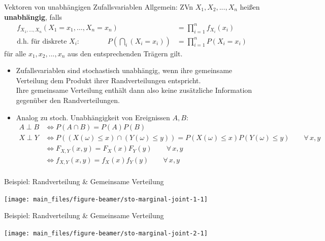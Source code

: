 \documentclass[
  10pt,
  ignorenonframetext,
]{beamer}
\begin{document}
\begin{frame}{Vektoren von unabhängigen Zufallsvariablen}
\label{vektoren-von-unabhuxe4ngigen-zufallsvariablen}
Allgemein: ZVn \(X_1, X_2, ..., X_n\) heißen \textbf{unabhängig}, falls
\begin{align*}
f_{X_1, \dots, X_n}(X_1 = x_1, ..., X_n = x_n) &= \prod_{i=1}^n f_{X_i}(x_i) \\
\text{d.h. für diskrete $X_i$:}\qquad\qquad P\left(\bigcap_i (X_i = x_i)\right) &= \prod_{i=1}^n P(X_i = x_i) 
\end{align*} für alle \(x_1, x_2, ..., x_n\) aus den entsprechenden
Trägern gilt.

\begin{itemize}
\item
  Zufallsvariablen sind stochastisch unabhängig, wenn ihre gemeinsame
  Verteilung dem Produkt ihrer Randverteilungen entspricht.\\
  Ihre gemeinsame Verteilung enthält dann also keine zusätzliche
  Information gegenüber den Randverteilungen.
\item
  Analog zu stoch. Unabhängigkeit von Ereignissen \(A, B\):
  \begin{align*}
  A \perp B &\iff P(A\cap B) = P(A)P(B) \\ 
  X \perp Y &\iff P((X(\omega) \leq x) \cap (Y(\omega) \leq y)) = P(X(\omega) \leq x)P(Y(\omega) \leq y) \qquad \forall\, x,y \\
                          &\iff F_{X,Y}(x, y) = F_X(x)F_Y(y)  \qquad \forall\, x,y  \\
                          &\iff f_{X,Y}(x, y) = f_X(x)f_Y(y)  \qquad \forall\, x,y  \\
  \end{align*}
\end{itemize}
\end{frame}

\begin{frame}{Beispiel: Randverteilung \& Gemeinsame Verteilung}
\label{beispiel-randverteilung-gemeinsame-verteilung}
\scriptsize\normalsize

\scriptsize

\begin{center}\texttt{[image: main\_files/figure-beamer/sto-marginal-joint-1-1]} \end{center}

\normalsize
\end{frame}

\begin{frame}{Beispiel: Randverteilung \& Gemeinsame Verteilung}
\label{beispiel-randverteilung-gemeinsame-verteilung-1}
\scriptsize

\begin{center}\texttt{[image: main\_files/figure-beamer/sto-marginal-joint-2-1]} \end{center}

\normalsize
\end{frame}
\end{document}
